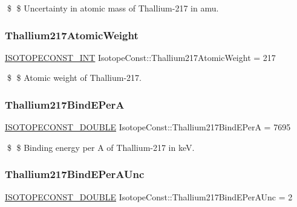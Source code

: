\$ \$ Uncertainty in atomic mass of Thallium-\/217 in amu. \mbox{\label{group___isotope_const-_thallium-_tl217_ga38c4b06ea813aa3a3a7f8241d88e3a68}} 
\subsubsection{\texorpdfstring{Thallium217\+Atomic\+Weight}{Thallium217AtomicWeight}}
{\footnotesize\ttfamily \mbox{\hyperlink{group___isotope_const-_macros_ga5f18360b3e99483a35c32d789e62621c}{I\+S\+O\+T\+O\+P\+E\+C\+O\+N\+S\+T\+\_\+\+I\+NT}} Isotope\+Const\+::\+Thallium217\+Atomic\+Weight = 217}

\$ \$ Atomic weight of Thallium-\/217. \mbox{\label{group___isotope_const-_thallium-_tl217_ga20efd6f1e8b7b7e614a0a3a637fe892f}} 
\subsubsection{\texorpdfstring{Thallium217\+Bind\+E\+PerA}{Thallium217BindEPerA}}
{\footnotesize\ttfamily \mbox{\hyperlink{group___isotope_const-_macros_ga8f45a7272ce02c0b4c65c44636ed719a}{I\+S\+O\+T\+O\+P\+E\+C\+O\+N\+S\+T\+\_\+\+D\+O\+U\+B\+LE}} Isotope\+Const\+::\+Thallium217\+Bind\+E\+PerA = 7695}

\$ \$ Binding energy per A of Thallium-\/217 in keV. \mbox{\label{group___isotope_const-_thallium-_tl217_ga04066d072610360bf75aa1b0c18b980b}} 
\subsubsection{\texorpdfstring{Thallium217\+Bind\+E\+Per\+A\+Unc}{Thallium217BindEPerAUnc}}
{\footnotesize\ttfamily \mbox{\hyperlink{group___isotope_const-_macros_ga8f45a7272ce02c0b4c65c44636ed719a}{I\+S\+O\+T\+O\+P\+E\+C\+O\+N\+S\+T\+\_\+\+D\+O\+U\+B\+LE}} Isotope\+Const\+::\+Thallium217\+Bind\+E\+Per\+A\+Unc = 2}

